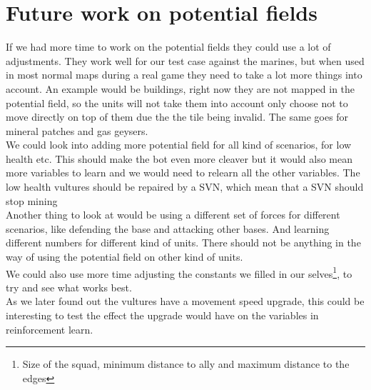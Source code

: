 \section{Future work on potential fields}
	If we had more time to work on the potential fields they could use a lot of adjustments. They work well for our test case against the marines, but when used in most normal maps during a real game they need to take a lot more things into account. An example would be buildings, right now they are not mapped in the potential field, so the units will not take them into account only choose not to move directly on top of them due the the tile being invalid. The same goes for mineral patches and gas geysers. \\
	
	We could look into adding more potential field for all kind of scenarios, for low health etc. This should make the bot even more cleaver but it would also mean more variables to learn and we would need to relearn all the other variables. The low health vultures should be repaired by a SVN, which mean that
a SVN should stop mining\\
	
	Another thing to look at would be using a different set of forces for different scenarios, like defending the base and attacking other bases. And learning different numbers for different kind of units. There should not be anything in the way of using the potential field on other kind of units. \\
	
	We could also use more time adjusting the constants we filled in our selves\footnote{Size of the squad, minimum distance to ally and maximum distance to the edges}, to try and see what works best. \\

	As we later found out the vultures have a movement speed upgrade, this could be interesting to test the effect the upgrade would have on the
variables in reinforcement learn.	